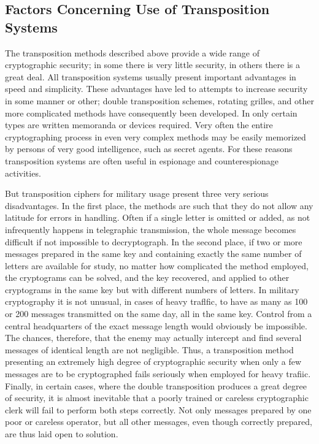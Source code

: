\subsection{Factors Concerning Use of Transposition Systems}

\mypara The transposition methods described above provide a wide range
of cryptographic security; in some there is very little security, in others
there is a great deal. All transposition systems usually present important
advantages in speed and simplicity. These advantages have led to attempts
to increase security in some manner or other; double transposition
schemes, rotating grilles, and other more complicated methods have consequently been developed. In only certain types are written memoranda
or devices required. Very often the entire cryptographing process in even
very complex methods may be easily memorized by persons of very good
intelligence, such as secret agents. For these reasons transposition systems
are often useful in espionage and counterespionage activities.

\mypara But transposition ciphers for military usage present three very
serious disadvantages. In the first place, the methods are such that they
do not allow any latitude for errors in handling. Often if a single letter
is omitted or added, as not infrequently happens in telegraphic transmission, the whole message becomes difficult if not impossible to decryptograph. In the second place, if two or more messages prepared in the
same key and containing exactly the same number of letters are available
for study, no matter how complicated the method employed, the cryptograms can be solved, and the key recovered, and applied to other
cryptograms in the same key but with different numbers of letters. In
military cryptography it is not unusual, in cases of heavy traﬂfic, to have
as many as 100 or 200 messages transmitted on the same day, all in the
same key. Control from a central headquarters of the exact message
length would obviously be impossible. The chances, therefore, that the
enemy may actually intercept and find several messages of identical
length are not negligible. Thus, a transposition method presenting an
extremely high degree of cryptographic security when only a few
messages are to be cryptographed fails seriously when employed for
heavy trafiic. Finally, in certain cases, where the double transposition
produces a great degree of security, it is almost inevitable that a poorly
trained or careless cryptographic clerk will fail to perform both steps
correctly. Not only messages prepared by one poor or careless operator,
but all other messages, even though correctly prepared, are thus laid
open to solution.
